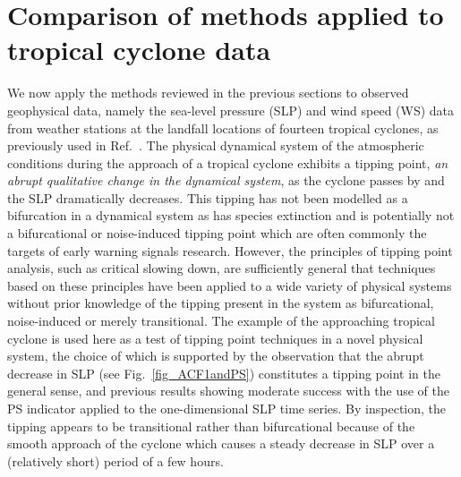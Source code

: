 \documentclass[%
aip,
amsmath,amssymb,
reprint,%
]{revtex4-1}
\newcommand{\newNote}[1]{{#1}}
\begin{document}
\section{Comparison of methods applied to tropical cyclone data}
\label{sec:AppliedHurricanes}
We now apply the methods reviewed in the previous sections to observed geophysical data, {\newNote namely the sea-level pressure (SLP) and wind speed (WS) data from weather stations at the landfall locations of fourteen tropical cyclones, as previously used in Ref.~. The physical dynamical system of the atmospheric conditions during the approach of a tropical cyclone exhibits a tipping point, \emph{an abrupt qualitative change in the dynamical system}\cite{scheffer2009,kuehn2011mathematical}, as the cyclone passes by and the SLP dramatically decreases. This tipping has not been modelled as a bifurcation in a dynamical system as has species extinction\cite{drake2010early} and is potentially not a bifurcational or noise-induced tipping point\cite{livina2007,ashwin2012} which are often commonly the targets of early warning signals research\cite{dakos2008,scheffer2009}. However, the principles of tipping point analysis, such as critical slowing down, are sufficiently general\cite{scheffer2009,kuehn2011mathematical} that techniques based on these principles have been applied to a wide variety of physical systems\cite{van2007,dakos2008} without prior knowledge of the tipping present in the system as bifurcational, noise-induced or merely transitional\cite{livina2011,ashwin2012}. The example of the approaching tropical cyclone is used here as a test of tipping point techniques in a novel physical system, the choice of which is supported by the observation that the abrupt decrease in SLP (see Fig.~\ref{fig_ACF1andPS}) constitutes a tipping point in the general sense\cite{scheffer2009critical,kuehn2011mathematical}, and previous results\cite{prettyman2018} showing moderate success with the use of the PS indicator applied to the one-dimensional SLP time series. By inspection, the tipping appears to be transitional\cite{livina2011} rather than bifurcational because of the smooth approach of the cyclone which causes a steady decrease in SLP over a (relatively short) period of a few hours.
}
\end{document}

